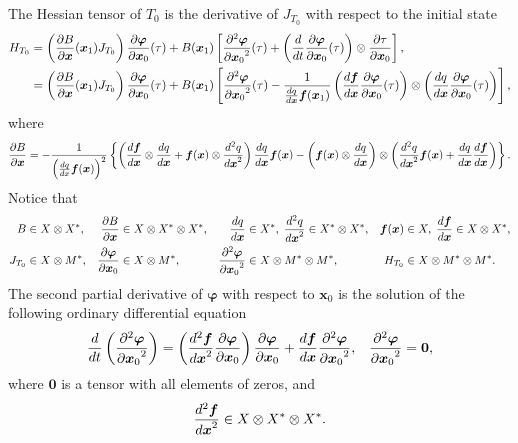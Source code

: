 \documentclass[a4paper]{article}
\newcommand{\deriv}[3][1]{%
    \ifthenelse{\equal{#1}{1}}{\frac{d #2}{d #3}}{\frac{d^#1 #2}{{d #3}^#1}}
}
\newcommand{\pderiv}[3][1]{%
    \ifthenelse{\equal{#1}{1}}{\frac{\partial #2}{\partial #3}}{\frac{\partial^#1 #2}{{\partial #3}^#1}}
}
\newcommand{\jac}{J}
\newcommand{\hes}{H}
\newcommand{\parens}[1]{\left(#1\right)}
\newcommand{\braces}[1]{\left\{#1\right\}}
\newcommand{\brackets}[1]{\left[#1\right]}
\newcommand{\traj}{\bm \varphi}
\begin{document}
The Hessian tensor of $T_0$ is the derivative of $\jac_{T_0}$ with respect to the initial state
\begin{align}
    \begin{aligned}
        \hes_{T_0}
        &=
        \parens{\pderiv{B}{\bm x}(\bm x_1) \jac_{T_0}}\pderiv{\traj}{\bm x_0}(\tau)
        +
        B(\bm x_1)\brackets{
            \pderiv[2]{\traj}{\bm x_0}(\tau)
            +
            \parens{\deriv{}{t} \pderiv{\traj}{\bm x_0}(\tau)} \otimes \pderiv{\tau}{\bm x_0}
        },
        \\
        &=
        \parens{\pderiv{B}{\bm x}(\bm x_1) \jac_{T_0}}\pderiv{\traj}{\bm x_0}(\tau)
        +
        B(\bm x_1)\brackets{
            \pderiv[2]{\traj}{\bm x_0}(\tau)
            -\frac{1}{\deriv{q}{\bm x}\bm f(\bm x_1)}
            \parens{\deriv{\bm f}{\bm x}\pderiv{\traj}{\bm x_0}(\tau)} \otimes
            \parens{\deriv{q}{\bm x} \pderiv{\traj}{\bm x_0}(\tau)}
        },
    \end{aligned}
\end{align}
where
\begin{align}
    \pderiv{B}{\bm x}
    =
    - \frac{1}{
        \parens{\deriv{q}{x} \bm f(\bm x)}^2
    }
    \braces{
        \parens{
            \deriv{\bm f}{\bm x} \otimes \deriv{q}{\bm x}
            +
            \bm f(\bm x) \otimes \deriv[2]{q}{\bm x}
        }
        \deriv{q}{\bm x} \bm f(\bm x)
        -
        \parens{\bm f(\bm x) \otimes \deriv{q}{\bm x}} \otimes
        \parens{
            \deriv[2]{q}{\bm x} \bm f(\bm x)
            +
            \deriv{q}{\bm x} \deriv{\bm f}{\bm x}
        }
    }.
\end{align}
Notice that
\begin{align}
    \begin{aligned}
        B &\in X \otimes X^* ,&
        \pderiv{B}{\bm x} &\in X \otimes X^* \otimes X^*, &
        \deriv{q}{\bm x}&\in X^*, \;
        \deriv[2]{q}{\bm x} \in X^* \otimes X^*, &
        \bm f(\bm x) &\in X, \;
        \deriv{\bm f}{\bm x} \in X \otimes X^*,\\
        \jac_{T_0} &\in X \otimes M^*, & \pderiv{\traj}{\bm x_0} & \in X \otimes M^*, &
        \pderiv[2]{\traj}{\bm x_0} &\in X \otimes M^* \otimes M^*, &
        \hes_{T_0} &\in X \otimes M^* \otimes M^*.
    \end{aligned}
\end{align}
The second partial derivative of $\traj$ with respect to $\bm x_0$ is the solution of the following
ordinary differential equation
\begin{align}
    \begin{aligned}
        \deriv{}{t}
        \parens{\pderiv[2]{\traj}{\bm x_0}}
        &=
        \parens{\deriv[2]{\bm f}{\bm x} \pderiv{\traj}{\bm x_0}}
        \pderiv{\traj}{\bm x_0}
        +
        \deriv{\bm f}{\bm x} \pderiv[2]{\traj}{\bm x_0},
        &
        \pderiv[2]{\traj}{\bm x_0} = \bm 0,
    \end{aligned}
\end{align}
where $\bm 0$ is a tensor with all elements of zeros, and
\begin{align}
    \begin{aligned}
        \deriv[2]{\bm f}{\bm x} \in X \otimes X^* \otimes X^*.
    \end{aligned}
\end{align}
\end{document}
